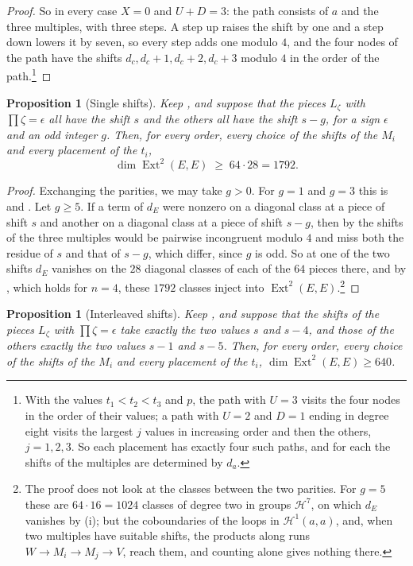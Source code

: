 \documentclass[11pt,reqno]{amsart}
\theoremstyle{plain}
\newtheorem{proposition}[theorem]{Proposition}
\theoremstyle{definition}
\theoremstyle{remark}
\newcommand{\cH}{\mathcal{H}}
\DeclareMathOperator{\Ext}{Ext}
\begin{document}
\begin{proof}
So in every case $X=0$ and $U+D=3$: the path consists of $a$ and the three
multiples, with three steps. A step up raises the shift by one and a step
down lowers it by seven, so every step adds one modulo $4$, and the four
nodes of the path have the shifts $d_{c},d_{c}+1,d_{c}+2,d_{c}+3$ modulo $4$
in the order of the path.\footnote{With the values $t_{1}<t_{2}<t_{3}$ and
$p$, the path with $U=3$ visits the four nodes in the order of their values;
a path with $U=2$ and $D=1$ ending in degree eight visits the largest $j$
values in increasing order and then the others, $j=1,2,3$. So each placement
has exactly four such paths, and for each the shifts of the multiples are
determined by $d_{a}$.}
\end{proof}

\begin{proposition}[Single shifts]\label{prop:efoursingle}
Keep , and suppose that the pieces $L_{\zeta}$ with
$\prod\zeta=\epsilon$ all have the shift $s$ and the others all have the
shift $s-g$, for a sign $\epsilon$ and an odd integer $g$. Then, for every
order, every choice of the shifts of the $M_{i}$ and every placement of the
$t_{i}$,
\[
  \dim\Ext^{2}(E,E)\;\ge\;64\cdot28=1792 .
\]
\end{proposition}

\begin{proof}
Exchanging the parities, we may take $g>0$. For $g=1$ and $g=3$ this is
 and . Let $g\ge5$. If a
term of $d_{E}$ were nonzero on a diagonal class at a piece of shift $s$ and
another on a diagonal class at a piece of shift $s-g$, then by
 the shifts of the three multiples would be pairwise
incongruent modulo $4$ and miss both the residue of $s$ and that of $s-g$,
which differ, since $g$ is odd. So at one of the two shifts $d_{E}$ vanishes
on the $28$ diagonal classes of each of the $64$ pieces there, and by
, which holds for $n=4$, these $1792$ classes
inject into $\Ext^{2}(E,E)$.\footnote{The proof does not look at the classes
between the two parities. For $g=5$ these are $64\cdot16=1024$ classes of
degree two in groups $\cH^{7}$, on which $d_{E}$ vanishes by
(i); but the coboundaries of the loops in
$\cH^{1}(a,a)$, and, when two multiples have suitable shifts, the products
along runs $W\to M_{i}\to M_{j}\to V$, reach them, and counting alone gives
nothing there.}
\end{proof}

\begin{proposition}[Interleaved shifts]\label{prop:efourpairs}
Keep , and suppose that the shifts of the pieces
$L_{\zeta}$ with $\prod\zeta=\epsilon$ take exactly the two values $s$ and
$s-4$, and those of the others exactly the two values $s-1$ and $s-5$. Then,
for every order, every choice of the shifts of the $M_{i}$ and every
placement of the $t_{i}$, $\dim\Ext^{2}(E,E)\ge640$.
\end{proposition}
\end{document}
